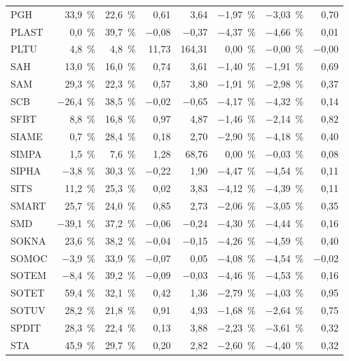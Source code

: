 \begin{longtable}{lrrrrrrr}
PGH & 33{,}9~\% & 22{,}6~\% & 0{,}61 & 3{,}64 & $-$1{,}97~\% & $-$3{,}03~\% & 0{,}70 \\
PLAST & 0{,}0~\% & 39{,}7~\% & $-$0{,}08 & $-$0{,}37 & $-$4{,}37~\% & $-$4{,}66~\% & 0{,}01 \\
PLTU & 4{,}8~\% & 4{,}8~\% & 11{,}73 & 164{,}31 & 0{,}00~\% & $-$0{,}00~\% & $-$0{,}00 \\
SAH & 13{,}0~\% & 16{,}0~\% & 0{,}74 & 3{,}61 & $-$1{,}40~\% & $-$1{,}91~\% & 0{,}69 \\
SAM & 29{,}3~\% & 22{,}3~\% & 0{,}57 & 3{,}80 & $-$1{,}91~\% & $-$2{,}98~\% & 0{,}37 \\
SCB & $-$26{,}4~\% & 38{,}5~\% & $-$0{,}02 & $-$0{,}65 & $-$4{,}17~\% & $-$4{,}32~\% & 0{,}14 \\
SFBT & 8{,}8~\% & 16{,}8~\% & 0{,}97 & 4{,}87 & $-$1{,}46~\% & $-$2{,}14~\% & 0{,}82 \\
SIAME & 0{,}7~\% & 28{,}4~\% & 0{,}18 & 2{,}70 & $-$2{,}90~\% & $-$4{,}18~\% & 0{,}40 \\
SIMPA & 1{,}5~\% & 7{,}6~\% & 1{,}28 & 68{,}76 & 0{,}00~\% & $-$0{,}03~\% & 0{,}08 \\
SIPHA & $-$3{,}8~\% & 30{,}3~\% & $-$0{,}22 & 1{,}90 & $-$4{,}47~\% & $-$4{,}54~\% & 0{,}11 \\
SITS & 11{,}2~\% & 25{,}3~\% & 0{,}02 & 3{,}83 & $-$4{,}12~\% & $-$4{,}39~\% & 0{,}11 \\
SMART & 25{,}7~\% & 24{,}0~\% & 0{,}85 & 2{,}73 & $-$2{,}06~\% & $-$3{,}05~\% & 0{,}35 \\
SMD & $-$39{,}1~\% & 37{,}2~\% & $-$0{,}06 & $-$0{,}24 & $-$4{,}30~\% & $-$4{,}44~\% & 0{,}16 \\
SOKNA & 23{,}6~\% & 38{,}2~\% & $-$0{,}04 & $-$0{,}15 & $-$4{,}26~\% & $-$4{,}59~\% & 0{,}40 \\
SOMOC & $-$3{,}9~\% & 33{,}9~\% & $-$0{,}07 & 0{,}05 & $-$4{,}08~\% & $-$4{,}54~\% & $-$0{,}02 \\
SOTEM & $-$8{,}4~\% & 39{,}2~\% & $-$0{,}09 & $-$0{,}03 & $-$4{,}46~\% & $-$4{,}53~\% & 0{,}16 \\
SOTET & 59{,}4~\% & 32{,}1~\% & 0{,}42 & 1{,}36 & $-$2{,}79~\% & $-$4{,}03~\% & 0{,}95 \\
SOTUV & 28{,}2~\% & 21{,}8~\% & 0{,}91 & 4{,}93 & $-$1{,}68~\% & $-$2{,}64~\% & 0{,}75 \\
SPDIT & 28{,}3~\% & 22{,}4~\% & 0{,}13 & 3{,}88 & $-$2{,}23~\% & $-$3{,}61~\% & 0{,}32 \\
STA & 45{,}9~\% & 29{,}7~\% & 0{,}20 & 2{,}82 & $-$2{,}60~\% & $-$4{,}40~\% & 0{,}32 \\

\end{longtable}
